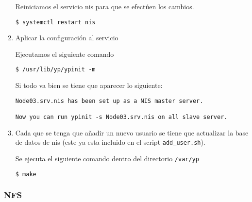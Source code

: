 \documentclass[../main.tex]{subfiles}
\begin{document}
\begin{enumerate}
        Reiniciamos el servicio nis para que se efectúen los cambios.

        \begin{listing}[H]
\begin{verbatim}
$ systemctl restart nis
\end{verbatim}
\end{listing}


  \item Aplicar la configuración al servicio

        Ejecutamos el siguiente comando

        \begin{listing}[H]
\begin{verbatim}
$ /usr/lib/yp/ypinit -m
\end{verbatim}
\end{listing}

        Si todo va bien se tiene que aparecer lo siguiente:

        \begin{listing}[H]
\begin{verbatim}
Node03.srv.nis has been set up as a NIS master server.

Now you can run ypinit -s Node03.srv.nis on all slave server.
\end{verbatim}
\end{listing}

  \item Cada que se tenga  que añadir un nuevo usuario se
        tiene que actualizar la base de datos de \acrshort{nis}\@
        (este ya esta incluido en el script \texttt{add\_user.sh}).

        Se ejecuta el siguiente comando dentro del directorio
        \texttt{/var/yp}

        \begin{listing}[H]
\begin{verbatim}
$ make
\end{verbatim}
\end{listing}

\end{enumerate}

\subsubsection{NFS}\label{sec:nfs}
\end{document}
